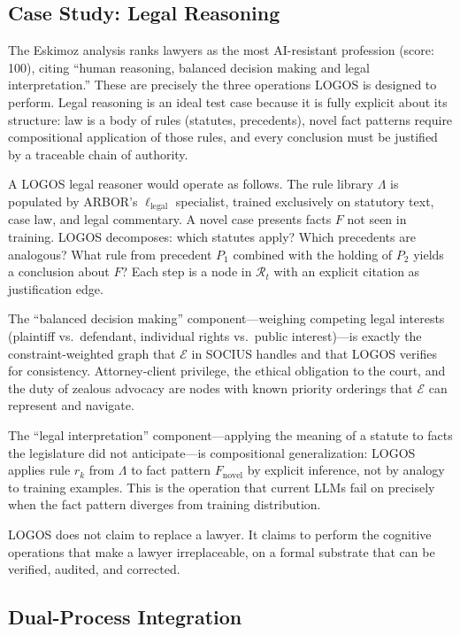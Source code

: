 \documentclass[12pt]{article}
\begin{document}
\subsection{Case Study: Legal Reasoning}

The Eskimoz analysis \cite{eskimoz2025} ranks lawyers as the most AI-resistant profession (score: 100), citing ``human reasoning, balanced decision making and legal interpretation.'' These are precisely the three operations LOGOS is designed to perform. Legal reasoning is an ideal test case because it is fully explicit about its structure: law is a body of rules (statutes, precedents), novel fact patterns require compositional application of those rules, and every conclusion must be justified by a traceable chain of authority.

A LOGOS legal reasoner would operate as follows. The rule library $\Lambda$ is populated by ARBOR's $\ell_{\text{legal}}$ specialist, trained exclusively on statutory text, case law, and legal commentary. A novel case presents facts $F$ not seen in training. LOGOS decomposes: which statutes apply? Which precedents are analogous? What rule from precedent $P_1$ combined with the holding of $P_2$ yields a conclusion about $F$? Each step is a node in $\mathcal{R}_t$ with an explicit citation as justification edge.

The ``balanced decision making'' component---weighing competing legal interests (plaintiff vs.\ defendant, individual rights vs.\ public interest)---is exactly the constraint-weighted graph that $\mathcal{E}$ in SOCIUS handles and that LOGOS verifies for consistency. Attorney-client privilege, the ethical obligation to the court, and the duty of zealous advocacy are nodes with known priority orderings that $\mathcal{E}$ can represent and navigate.

The ``legal interpretation'' component---applying the meaning of a statute to facts the legislature did not anticipate---is compositional generalization: LOGOS applies rule $r_k$ from $\Lambda$ to fact pattern $F_{\text{novel}}$ by explicit inference, not by analogy to training examples. This is the operation that current LLMs fail on precisely when the fact pattern diverges from training distribution.

LOGOS does not claim to replace a lawyer. It claims to perform the cognitive operations that make a lawyer irreplaceable, on a formal substrate that can be verified, audited, and corrected.

\subsection{Dual-Process Integration}
\end{document}
